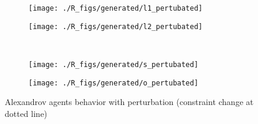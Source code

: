 \begin{figure}[]
\centering
  	\begin{subfigure}[b]{0.4\textwidth}
		\centering
		\texttt{[image: ./R\_figs/generated/l1\_pertubated]}
		\label{alexandrov_res_pert:l1}
	\end{subfigure}
	\begin{subfigure}[b]{0.4\textwidth}
		\centering
		\texttt{[image: ./R\_figs/generated/l2\_pertubated]}
		\label{alexandrov_res_pert:l2}
	\end{subfigure}
	\vspace{-20pt}
	\\
	\begin{subfigure}[b]{0.4\textwidth}
		\centering
		\texttt{[image: ./R\_figs/generated/s\_pertubated]}
		\label{alexandrov_res_pert:s}
	\end{subfigure}
	\begin{subfigure}[b]{0.4\textwidth}
		\centering
		\texttt{[image: ./R\_figs/generated/o\_pertubated]}
		\label{alexandrov_res_pert:o}
	\end{subfigure}
	
	\caption{Alexandrov agents behavior with perturbation (constraint change at dotted line)}
	\label{alexandrov_res_pert}
	
\end{figure}